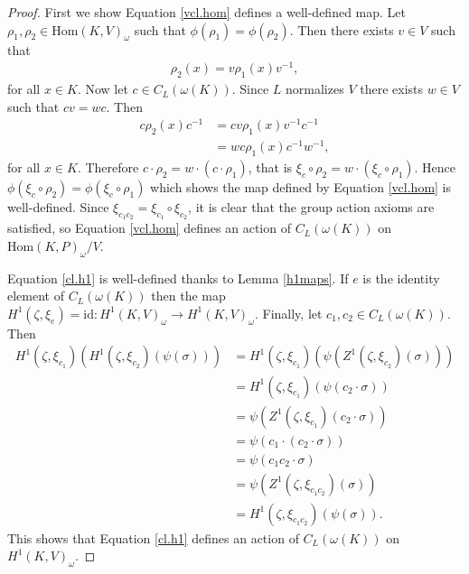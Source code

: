 \begin{proof}
	First we show Equation \ref{vcl.hom} defines a well-defined map. Let $\rho_1, \rho_2 \in \mathrm{Hom}(K, V)_\omega$ such that $\phi(\rho_1) = \phi(\rho_2)$. Then there exists $v \in V$ such that
	\begin{align*} \rho_2(x) = v\rho_1(x)v^{-1}, \end{align*}
		for all $x \in K$. Now let $c \in C_L(\omega(K))$. Since $L$ normalizes $V$ there exists $w \in V$ such that $cv = wc$. Then
		\begin{align*}
			c \rho_2(x)c^{-1}
			&= cv \rho_1(x) v^{-1}c^{-1} \\
			&= wc \rho_1(x) c^{-1}w^{-1},
		\end{align*}
		for all $x \in K$. Therefore $c\cdot\rho_2 = w\cdot(c\cdot\rho_1)$, that is $\xi_c \circ\rho_2 = w\cdot(\xi_c\circ\rho_1)$. Hence $\phi(\xi_c \circ \rho_2) = \phi(\xi_c \circ \rho_1)$ which shows the map defined by Equation \ref{vcl.hom} is well-defined. Since $\xi_{c_1c_2} = \xi_{c_1} \circ \xi_{c_2}$, it is clear that the group action axioms are satisfied, so Equation \ref{vcl.hom} defines an action of $C_L(\omega(K))$ on $\mathrm{Hom}(K, P)_\omega/V$.

		Equation \ref{cl.h1} is well-defined thanks to Lemma \ref{h1maps}. If $e$ is the identity element of $C_L(\omega(K))$ then the map $H^1(\zeta, \xi_e) = \mathrm{id}:H^1(K, V)_\omega \rightarrow H^1(K, V)_\omega$. Finally, let $c_1, c_2 \in C_L(\omega(K))$. Then
		\begin{align}
			H^1(\zeta, \xi_{c_1})\left(H^1(\zeta, \xi_{c_2})(\psi(\sigma))\right)
			&= H^1(\zeta, \xi_{c_1})\left(\psi(Z^1(\zeta, \xi_{c_2})(\sigma))\right)\nonumber \\
			&= H^1(\zeta, \xi_{c_1})\left(\psi(c_2 \cdot \sigma)\right)\nonumber \\
			&= \psi\left( Z^1(\zeta, \xi_{c_1})(c_2 \cdot \sigma)\right)\nonumber \\
			&= \psi\left( c_1 \cdot (c_2 \cdot \sigma)\right)\nonumber \\
			&= \psi\left( c_1c_2 \cdot \sigma\right)\nonumber \\
			&= \psi\left( Z^1(\zeta, \xi_{c_1c_2})(\sigma)\right)\nonumber \\
			&= H^1(\zeta, \xi_{c_1c_2})\left(\psi(\sigma)\right).\label{eqn:functorial}
		\end{align}
		This shows that Equation \ref{cl.h1} defines an action of $C_L(\omega(K))$ on $H^1(K, V)_\omega$.


\end{proof}

